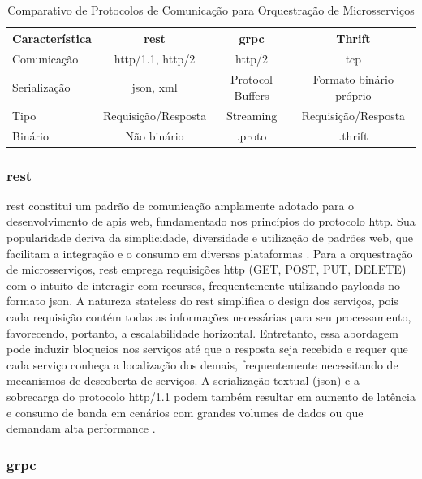\begin{table}[H]
\centering
\begin{tabularx}{\textwidth}{|X|c|c|c|}
\hline
\textbf{Característica} & \textbf{\gls{rest}} & \textbf{\gls{grpc}} & \textbf{Thrift} \\
\hline
Comunicação & \acrshort{http}/1.1, \acrshort{http}/2 & \acrshort{http}/2 & \acrshort{tcp} \\
\hline
Serialização & \acrshort{json}, \acrshort{xml} & Protocol Buffers & Formato binário próprio \\
\hline
Tipo & Requisição/Resposta & Streaming & Requisição/Resposta \\
\hline
Binário & Não binário & .proto & .thrift \\
\hline
\end{tabularx}
\caption{Comparativo de Protocolos de Comunicação para Orquestração de Microsserviços}
\label{tab:2-protocolos}
\end{table}

\subsubsection{\acrfull{rest}}

\gls{rest} constitui um padrão de comunicação amplamente adotado para o desenvolvimento de \gls{api}s web, fundamentado nos princípios do protocolo \gls{http}. Sua popularidade deriva da simplicidade, diversidade e utilização de padrões web, que facilitam a integração e o consumo em diversas plataformas \cite{mozilla_rest_2023}. Para a orquestração de microsserviços, \gls{rest} emprega requisições \gls{http} (GET, POST, PUT, DELETE) com o intuito de interagir com recursos, frequentemente utilizando payloads no formato \acrshort{json}. A natureza stateless do \gls{rest} simplifica o design dos serviços, pois cada requisição contém todas as informações necessárias para seu processamento, favorecendo, portanto, a escalabilidade horizontal. Entretanto, essa abordagem pode induzir bloqueios nos serviços até que a resposta seja recebida e requer que cada serviço conheça a localização dos demais, frequentemente necessitando de mecanismos de descoberta de serviços. A serialização textual (\acrshort{json}) e a sobrecarga do protocolo \gls{http}/1.1 podem também resultar em aumento de latência e consumo de banda em cenários com grandes volumes de dados ou que demandam alta performance \cite{mozilla_rest_2023}.

\subsubsection{\acrfull{grpc}}

